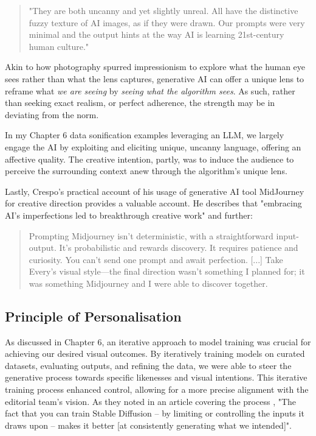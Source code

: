 \begin{quote}
"They are both uncanny and yet slightly unreal. All have the distinctive fuzzy texture of AI images, as if they were drawn. Our prompts were very minimal and the output hints at the way AI is learning 21st-century human culture."
\end{quote}

Akin to how photography spurred impressionism to explore what the human eye sees rather than what the lens captures, generative AI can offer a unique lens to reframe what \textit{we are seeing} by \textit{seeing what the algorithm sees}. As such, rather than seeking exact realism, or perfect adherence, the strength may be in deviating from the norm. 

In my Chapter 6 data sonification examples leveraging an LLM, we largely engage the AI by exploiting and eliciting unique, uncanny language, offering an affective quality. The creative intention, partly, was to induce the audience to perceive the surrounding context anew through the algorithm's unique lens.

Lastly, Crespo's practical account of his usage of generative AI tool MidJourney for creative direction provides a valuable account. He describes that "embracing AI's imperfections led to breakthrough creative work" and further: 

\begin{quote}
Prompting Midjourney isn't deterministic, with a straightforward input-output. It's probabilistic and rewards discovery. It requires patience and curiosity. You can't send one prompt and await perfection. 
[...]
Take Every's visual style—the final direction wasn't something I planned for; it was something Midjourney and I were able to discover together.
\end{quote} \cite{Crespo2022-ty}


\subsection{Principle of Personalisation}

 As discussed in Chapter 6, an iterative approach to model training was crucial for achieving our desired visual outcomes. By iteratively training models on curated datasets, evaluating outputs, and refining the data, we were able to steer the generative process towards specific likenesses and visual intentions. This iterative training process enhanced control, allowing for a more precise alignment with the editorial team's vision. As they noted in an article covering the process \cite{Drummond2023-bh}, "The fact that you can train Stable Diffusion – by limiting or controlling the inputs it draws upon – makes it better [at consistently generating what we intended]".

